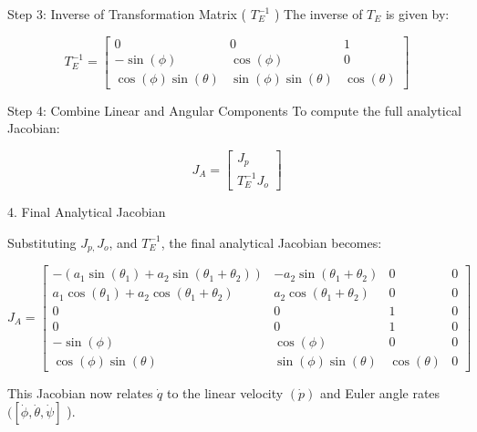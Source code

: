 \documentclass[12pt]{report}
\begin{document}
Step 3: Inverse of Transformation Matrix ( $T_E^{-1}$ )
The inverse of $T_E$ is given by:

\begin{equation}
	T_E^{-1} =
	\begin{bmatrix}
		0 & 0 & 1 \\
		-\sin (\phi) & \cos (\phi) & 0 \\
		\cos (\phi) \sin (\theta) & \sin (\phi) \sin (\theta) & \cos (\theta)
	\end{bmatrix}
\end{equation}



Step 4: Combine Linear and Angular Components
To compute the full analytical Jacobian:

\begin{equation}
	J_A =
	\begin{bmatrix}
		J_p \\
		T_E^{-1} J_o
	\end{bmatrix}
\end{equation}

4. Final Analytical Jacobian

Substituting $J_{p,} J_o$, and $T_E^{-1}$, the final analytical Jacobian becomes:

\begin{equation}
	J_A =
	\begin{bmatrix}
		-\left(a_1 \sin \left(\theta_1\right) + a_2 \sin \left(\theta_1 + \theta_2\right)\right) & -a_2 \sin \left(\theta_1 + \theta_2\right) & 0 & 0 \\
		a_1 \cos \left(\theta_1\right) + a_2 \cos \left(\theta_1 + \theta_2\right) & a_2 \cos \left(\theta_1 + \theta_2\right) & 0 & 0 \\
		0 & 0 & 1 & 0 \\
		0 & 0 & 1 & 0 \\
		-\sin (\phi) & \cos (\phi) & 0 & 0 \\
		\cos (\phi) \sin (\theta) & \sin (\phi) \sin (\theta) & \cos (\theta) & 0
	\end{bmatrix}
\end{equation}



This Jacobian now relates $\dot{q}$ to the linear velocity $(\dot{p})$ and Euler angle rates $([\dot{\phi}, \dot{\theta}, \dot{\psi}]$ ).
\end{document}
